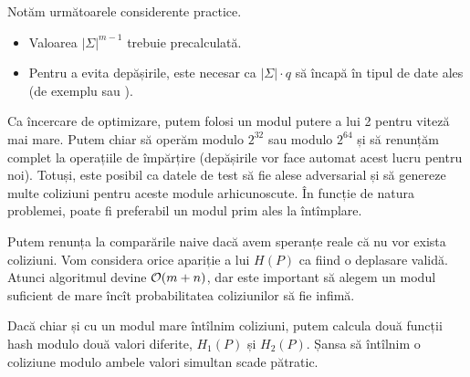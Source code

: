 \documentclass[../main.tex]{subfiles}
\begin{document}
Notăm următoarele considerente practice.

\begin{itemize}
  \item Valoarea $|\Sigma|^{m-1}$ trebuie precalculată.
  \item Pentru a evita depășirile, este necesar ca $|\Sigma| \cdot q$ să încapă în tipul de date ales (de exemplu  sau ).
\end{itemize}

Ca încercare de optimizare, putem folosi un modul putere a lui 2 pentru viteză mai mare. Putem chiar să operăm modulo $2^{32}$ sau modulo $2^{64}$ și să renunțăm complet la operațiile de împărțire (depășirile vor face automat acest lucru pentru noi). Totuși, este posibil ca datele de test să fie alese adversarial și să genereze multe coliziuni pentru aceste module arhicunoscute. În funcție de natura problemei, poate fi preferabil un modul prim ales la întîmplare.

Putem renunța la comparările naive dacă avem speranțe reale că nu vor exista coliziuni. Vom considera orice apariție a lui $H(P)$ ca fiind o deplasare validă. Atunci algoritmul devine $\mathcal{O}(m + n)$, dar este important să alegem un modul suficient de mare încît probabilitatea coliziunilor să fie infimă.

Dacă chiar și cu un modul mare întîlnim coliziuni, putem calcula două funcții hash modulo două valori diferite, $H_1(P)$ și $H_2(P)$. Șansa să întîlnim o coliziune modulo ambele valori simultan scade pătratic.
\end{document}
